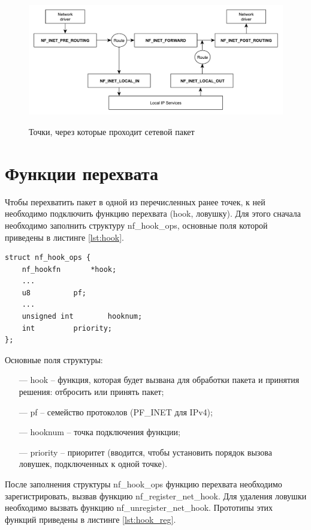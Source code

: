 \documentclass{bmstu}
\begin{document}
\begin{figure}[h]
	\centering
	\begin{center}
		{\includegraphics[scale=0.6]{inc/img/packets.pdf}}
		\caption{Точки, через которые проходит сетевой пакет}
		\label{img:packets}
	\end{center}
\end{figure} 

\section*{Функции перехвата}
Чтобы перехватить пакет в одной из перечисленных ранее точек, к ней необходимо подключить функцию перехвата (hook, ловушку). Для этого сначала необходимо заполнить структуру nf\_hook\_ops, основные поля которой приведены в листинге \ref{lst:hook}.

\begin{lstlisting}[caption = {Структура struct nf\_hook\_ops}, label=lst:hook]
struct nf_hook_ops {
	nf_hookfn		*hook;
	...
	u8			pf;
	...
	unsigned int		hooknum;
	int			priority;
};
\end{lstlisting}


Основные поля структуры:
\begin{itemize}
	\item[---] hook -- функция, которая будет вызвана для обработки пакета и принятия решения: отбросить или принять пакет;
	
	\item[---] pf -- семейство протоколов (PF\_INET для IPv4);
	
	\item[---] hooknum -- точка подключения функции;
	
	\item[---] priority -- приоритет (вводится, чтобы установить порядок вызова ловушек, подключенных к одной точке).
\end{itemize}

После заполнения структуры nf\_hook\_ops функцию перехвата необходимо зарегистрировать, вызвав функцию nf\_register\_net\_hook. Для удаления ловушки необходимо вызвать функцию nf\_unregister\_net\_hook. Прототипы этих функций приведены в листинге \ref{lst:hook_reg}.
\end{document}
